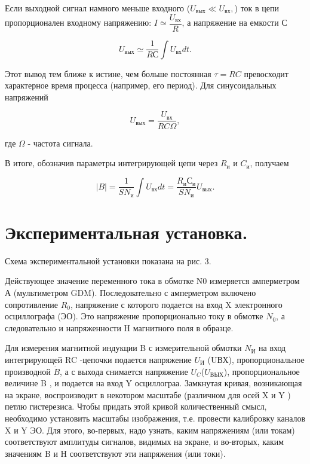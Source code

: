 \documentclass[a4paper,12pt]{article}
\begin{document}
	Если выходной сигнал намного меньше входного ($U_{вых}\ll U_{вх},$) ток в цепи пропорционален входному напряжению: $I\simeq\dfrac{U_{вх}}{R}$, а напряжение на емкости С
	
	$$U_{вых}\simeq\dfrac{1}{RС}\int U_{вх}dt.$$
	
	Этот вывод тем ближе к истине, чем больше постоянная $\tau=RC$ превосходит характерное время процесса (например, его период). Для синусоидальных напряжений
	
	$$U_{вых}=\dfrac{U_{вх}}{RC\Omega},$$
	
	где $\Omega$ - частота сигнала.
	
	В итоге, обозначив параметры интегрирующей цепи через $R_{и}$ и $C_{и}$, получаем
	
	$$ |B|=\dfrac{1}{SN_{и}}\int U_{вх}dt=\dfrac{R_{и}С_{и}}{SN_{и}}U_{вых}.$$
	
	\section{Экспериментальная установка.}
	Схема экспериментальной установки показана на рис. 3.
	
	Действующее значение переменного тока в обмотке N0 измеряется амперметром А (мультиметром GDM). Последовательно с амперметром включено сопротивление $R_{0}$, напряжение с которого подается на вход X электронного осциллографа (ЭО). Это напряжение пропорционально току в обмотке $N_{0}$, а следовательно и напряженности H магнитного поля в образце.
	
	Для измерения магнитной индукции B с измерительной обмотки $N_{И}$ на вход интегрирующей RC -цепочки подается напряжение $U_{И}$ (UВХ), пропорциональное производной $\dot{B}$, а с выхода снимается напряжение $U_{C}$($U_{ВЫХ}$), пропорциональное
	величине B , и подается на вход Y осциллограа.
	Замкнутая кривая, возникающая на экране, воспроизводит в некотором масштабе (различном для осей X и Y ) петлю гистерезиса. Чтобы придать этой кривой количественный смысл, необходимо установить масштабы изображения, т.е. провести калибровку каналов X и Y ЭО. Для этого, во-первых, надо узнать, каким напряжениям (или токам) соответствуют амплитуды сигналов, видимых на экране, и во-вторых,  каким значениям B и H соответствуют эти напряжения
	(или токи).
	
\end{document}

